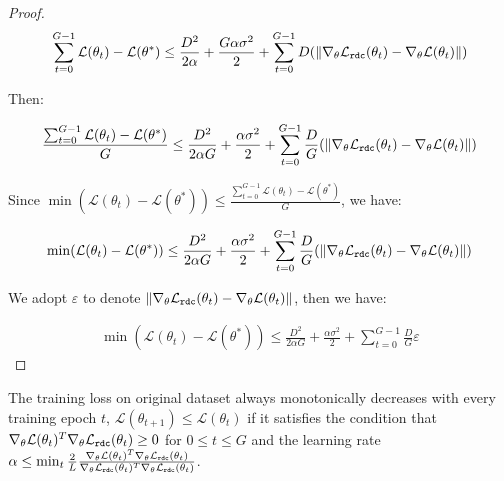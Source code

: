 \begin{proof}
\begin{align}
    \sum_{t=0}^{G-1}\mathcal{L}(\theta_t) - \mathcal{L}(\theta^*) \leq \frac{D^2}{2\alpha} + \frac{G\alpha\sigma^2}{2}
    + \sum_{t=0}^{G-1}D(\|\nabla_{\theta} \mathcal L_{\mathtt{rdc}}(\theta_t) - \nabla_{\theta} \mathcal{L}(\theta_t)\|)
\end{align}

Then:

\begin{align}
    \frac{\sum_{t=0}^{G-1}\mathcal{L}(\theta_t) - \mathcal{L}(\theta^*)}{G} \leq \frac{D^2}{2\alpha G} + \frac{\alpha\sigma^2}{2}
    + \sum_{t=0}^{G-1}\frac{D}{G}(\|\nabla_{\theta} \mathcal L_{\mathtt{rdc}}(\theta_t) - \nabla_{\theta} \mathcal{L}(\theta_t)\|)
\end{align}

Since $\min(\mathcal{L}(\theta_t) - \mathcal{L}(\theta^*))\leq \frac{\sum_{t=0}^{G-1}\mathcal{L}(\theta_t) - \mathcal{L}(\theta^*)}{G}$, we have:

\begin{align}
    \min(\mathcal{L}(\theta_t) - \mathcal{L}(\theta^*))\leq \frac{D^2}{2\alpha G} + \frac{\alpha\sigma^2}{2}
    + \sum_{t=0}^{G-1}\frac{D}{G}(\|\nabla_{\theta} \mathcal L_{\mathtt{rdc}}(\theta_t) - \nabla_{\theta} \mathcal{L}(\theta_t)\|)
\end{align}

We adopt $\varepsilon$ to denote $\|\nabla_{\theta} \mathcal L_{\mathtt{rdc}}(\theta_t) - \nabla_{\theta} \mathcal{L}(\theta_t)\|$, then we have:

\begin{align}
    \min(\mathcal{L}(\theta_t) - \mathcal{L}(\theta^*))\leq \frac{D^2}{2\alpha G} + \frac{\alpha\sigma^2}{2}
    + \sum_{t=0}^{G-1}\frac{D}{G}\varepsilon
\end{align}
     
\end{proof}


\begin{theorem}\label{thm:monotone}
    The training loss on original dataset always monotonically decreases with every training epoch $t$, $\mathcal{L}(\theta_{t+1}) \leq \mathcal{L}(\theta_t)$ if it satisfies the condition that $\nabla_{\theta} \mathcal{L}(\theta_t)^T\nabla_{\theta} \mathcal L_{\mathtt{rdc}}(\theta_t) \geq 0$ for $0\leq t \leq G$ and the learning rate $\alpha \leq \min_{t} \frac{2}{L}\frac{\nabla_{\theta} \mathcal{L}(\theta_t)^T\nabla_{\theta} \mathcal L_{\mathtt{rdc}}(\theta_t)}{\nabla_{\theta} \mathcal L_{\mathtt{rdc}}(\theta_t)^T\nabla_{\theta} \mathcal L_{\mathtt{rdc}}(\theta_t)}$.
\end{theorem}

